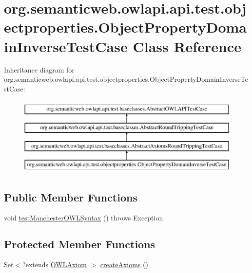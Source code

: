 \hypertarget{classorg_1_1semanticweb_1_1owlapi_1_1api_1_1test_1_1objectproperties_1_1_object_property_domain_inverse_test_case}{\section{org.\-semanticweb.\-owlapi.\-api.\-test.\-objectproperties.\-Object\-Property\-Domain\-Inverse\-Test\-Case Class Reference}
\label{classorg_1_1semanticweb_1_1owlapi_1_1api_1_1test_1_1objectproperties_1_1_object_property_domain_inverse_test_case}
}
Inheritance diagram for org.\-semanticweb.\-owlapi.\-api.\-test.\-objectproperties.\-Object\-Property\-Domain\-Inverse\-Test\-Case\-:\begin{figure}[H]
\begin{center}
\leavevmode
\includegraphics[height=4.000000cm]{classorg_1_1semanticweb_1_1owlapi_1_1api_1_1test_1_1objectproperties_1_1_object_property_domain_inverse_test_case}
\end{center}
\end{figure}
\subsection*{Public Member Functions}
\begin{DoxyCompactItemize}
\item 
void \hyperlink{classorg_1_1semanticweb_1_1owlapi_1_1api_1_1test_1_1objectproperties_1_1_object_property_domain_inverse_test_case_ae6b76d30520ff58d6af95b8548247e5f}{test\-Manchester\-O\-W\-L\-Syntax} ()  throws Exception 
\end{DoxyCompactItemize}
\subsection*{Protected Member Functions}
\begin{DoxyCompactItemize}
\item 
Set$<$?extends \hyperlink{interfaceorg_1_1semanticweb_1_1owlapi_1_1model_1_1_o_w_l_axiom}{O\-W\-L\-Axiom} $>$ \hyperlink{classorg_1_1semanticweb_1_1owlapi_1_1api_1_1test_1_1objectproperties_1_1_object_property_domain_inverse_test_case_a05dc90c8e653c12294c05991c8fa8095}{create\-Axioms} ()
\end{DoxyCompactItemize}


